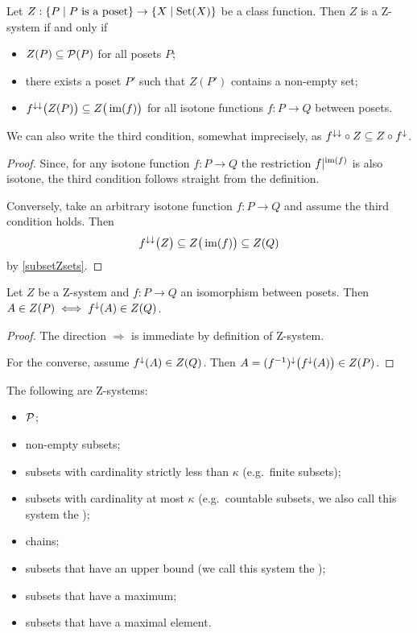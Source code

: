 \begin{lemma}
Let $Z: \setbuilder{P}{\text{$P$ is a poset}} \to \setbuilder{X}{\Set(X)}$ be a class function. Then $Z$ is a $\mathrm{Z}$-system \textup{if and only if}
\begin{itemize}
\item $Z(P) \subseteq \operatorname{\mathcal{P}}(P)$ for all posets $P$;
\item there exists a poset $P'$ such that $Z(P')$ contains a non-empty set;
\item $f^{\downarrow\downarrow}\big(Z(P)\big) \subseteq Z\big(\operatorname{im}(f)\big)$ for all isotone functions $f: P\to Q$ between posets.
\end{itemize}
\end{lemma}
We can also write the third condition, somewhat imprecisely, as $f^{\downarrow\downarrow}\circ Z \subseteq Z\circ f^\downarrow$.
\begin{proof}
Since, for any isotone function $f: P\to Q$ the restriction $f|^{\operatorname{im}(f)}$ is also isotone, the third condition follows straight from the definition.

Conversely, take an arbitrary isotone function $f: P\to Q$ and assume the third condition holds. Then
\[ f^{\downarrow\downarrow}\big(Z\big) \subseteq Z\big(\operatorname{im}(f)\big) \subseteq Z(Q) \]
by \ref{subsetZsets}.
\end{proof}

\begin{lemma} \label{isomorphismsPreserveZstructure}
Let $Z$ be a $\mathrm{Z}$-system and $f: P\to Q$ an isomorphism between posets. Then $A\in Z(P) \iff f^\downarrow(A) \in Z(Q)$.
\end{lemma}
\begin{proof}
The direction $\Rightarrow$ is immediate by definition of Z-system.

For the converse, assume $f^\downarrow(A)\in Z(Q)$. Then $A = (f^{-1})^{\downarrow}\big(f^\downarrow(A)\big) \in Z(P)$.
\end{proof}

\begin{example}
The following are $\mathrm{Z}$-systems:
\begin{itemize}
\item $\operatorname{\mathcal{P}}$;
\item non-empty subsets;
\item subsets with cardinality strictly less than $\kappa$ (e.g.\ finite subsets);
\item subsets with cardinality at most $\kappa$ (e.g.\ countable subsets, we also call this system the );
\item chains;
\item subsets that have an upper bound (we call this system the );
\item subsets that have a maximum;
\item subsets that have a maximal element.
\end{itemize}
\end{example}

